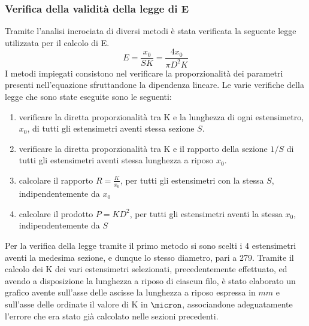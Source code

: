 \documentclass[a4paper,11pt,oneside]{article}
\begin{document}
\subsubsection*{Verifica della validità della legge di E}
Tramite l'analisi incrociata di diversi metodi è stata verificata la seguente legge utilizzata per il calcolo di E.
\begin{equation*}
    E=\frac{x_0}{S K}=\frac{4 x_0}{\pi D^{2}K}
    \label{equation:legge_e}
\end{equation*}
I metodi impiegati consistono nel verificare la proporzionalità dei parametri presenti nell'equazione sfruttandone la dipendenza lineare. Le varie verifiche della legge che sono state eseguite sono le seguenti:
\begin{enumerate}
    \item verificare la diretta proporzionalità tra K e la lunghezza di ogni estensimetro, $x_0$, di tutti gli estensimetri aventi stessa sezione $S$.
    \item verificare la diretta proporzionalità tra K e il rapporto della sezione $1/S$ di tutti gli estensimetri aventi stessa lunghezza a riposo $x_{0}$.
    \item calcolare il rapporto $R=\frac{K}{x_{0}}$, per tutti gli estensimetri con la stessa $S$, indipendentemente da $x_{0}$
    \item calcolare il prodotto $P= KD^2 $, per tutti gli estensimetri aventi la stessa $x_{0}$, indipendentemente da $S$
\end{enumerate}
Per la verifica della legge tramite il primo metodo si sono scelti i 4  estensimetri aventi la medesima sezione, e dunque lo stesso diametro, pari a \SI{279}{\micron}. Tramite il calcolo dei K dei vari estensimetri selezionati, precedentemente effettuato, ed avendo a disposizione la lunghezza a riposo di ciascun filo, è stato elaborato un grafico avente sull'asse delle ascisse la lunghezza a riposo espressa in $mm$ e sull'asse delle ordinate il valore di K in $\micron$, associandone adeguatamente l'errore che era stato già calcolato nelle sezioni precedenti.
\end{document}
